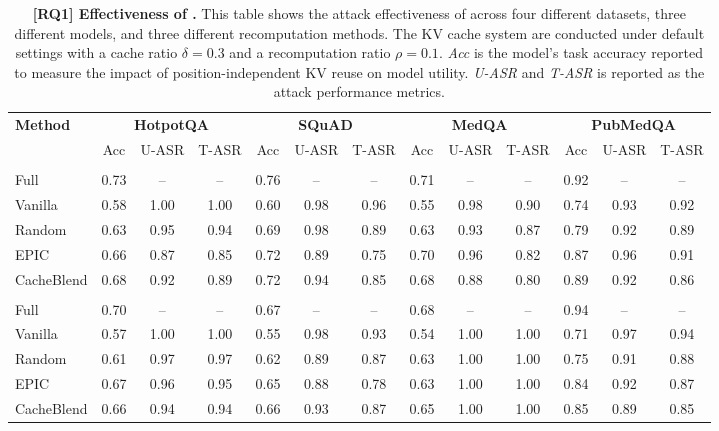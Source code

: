 \begin{table}[t]
\centering
\caption{\textbf{[RQ1] Effectiveness of \sys.} This table shows the attack effectiveness of \sys across four different datasets, three different models, and three different recomputation methods. The KV cache system are conducted under default settings with a cache ratio $\delta = 0.3$ and a recomputation ratio $\rho = 0.1$. \textit{Acc} is the model's task accuracy reported to measure the impact of position-independent KV reuse on model utility. \textit{U-ASR} and \textit{T-ASR} is reported as the attack performance metrics. }
\label{tab:rq1_main}

\footnotesize
\setlength{\tabcolsep}{0pt}

\begin{tabular*}{\textwidth}{@{\extracolsep{\fill}} l ccc ccc ccc ccc }
\toprule
\multirow{2}{*}{\textbf{Method}} & \multicolumn{3}{c}{\textbf{HotpotQA}} & \multicolumn{3}{c}{\textbf{SQuAD}} & \multicolumn{3}{c}{\textbf{MedQA}} & \multicolumn{3}{c}{\textbf{PubMedQA}} \\
\cmidrule(lr){2-4} \cmidrule(lr){5-7} \cmidrule(lr){8-10} \cmidrule(lr){11-13}
 & Acc & U-ASR & T-ASR & Acc & U-ASR & T-ASR & Acc & U-ASR & T-ASR & Acc & U-ASR & T-ASR \\
\midrule

\rowcolor{sectionbg}
\multicolumn{13}{l}{\textbf{Llama-3.1-8B}} \\
Full        & 0.73 & --   & --   & 0.76 & --   & --   & 0.71 & --   & --   & 0.92 & -- & -- \\
Vanilla     & 0.58 & 1.00 & 1.00 & 0.60 & 0.98 & 0.96 & 0.55 & 0.98 & 0.90 & 0.74 & 0.93 & 0.92 \\
Random      & 0.63 & 0.95 & 0.94 & 0.69 & 0.98 & 0.89 & 0.63 & 0.93 & 0.87 & 0.79 & 0.92 & 0.89 \\
EPIC        & 0.66 & 0.87 & 0.85 & 0.72 & 0.89 & 0.75 & 0.70 & 0.96 & 0.82 & 0.87 & 0.96 & 0.91 \\
CacheBlend  & 0.68 & 0.92 & 0.89 & 0.72 & 0.94 & 0.85 & 0.68 & 0.88 & 0.80 & 0.89 & 0.92 & 0.86 \\

\rowcolor{sectionbg}
\multicolumn{13}{l}{\textbf{Ministral-8B}} \\
Full        & 0.70 & --   & --   & 0.67 & --   & --   & 0.68 & --   & --   & 0.94 & -- & -- \\
Vanilla     & 0.57 & 1.00 & 1.00 & 0.55 & 0.98 & 0.93 & 0.54 & 1.00 & 1.00 & 0.71 & 0.97 & 0.94 \\
Random      & 0.61 & 0.97 & 0.97 & 0.62 & 0.89 & 0.87 & 0.63 & 1.00 & 1.00 & 0.75 & 0.91 & 0.88 \\
EPIC        & 0.67 & 0.96 & 0.95 & 0.65 & 0.88 & 0.78 & 0.63 & 1.00 & 1.00 & 0.84 & 0.92 & 0.87 \\
CacheBlend  & 0.66 & 0.94 & 0.94 & 0.66 & 0.93 & 0.87 & 0.65 & 1.00 & 1.00 & 0.85 & 0.89 & 0.85 \\


\end{tabular*}
\end{table}
